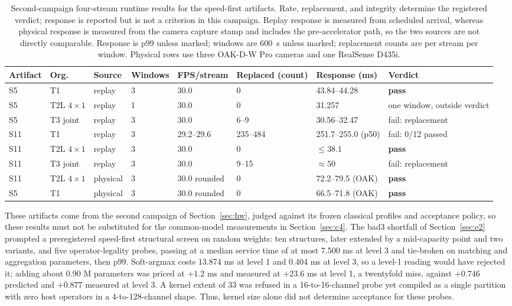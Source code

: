 \documentclass[sigconf,review,anonymous]{acmart}
\begin{document}
\begin{table}[t]
\centering
\footnotesize
\caption{Second-campaign four-stream runtime results for the speed-first artifacts. Rate, replacement, and integrity determine the registered verdict; response is reported but is not a criterion in this campaign. Replay response is measured from scheduled arrival, whereas physical response is measured from the camera capture stamp and includes the pre-accelerator path, so the two sources are not directly comparable. Response is p99 unless marked; windows are 600~s unless marked; replacement counts are per stream per window. Physical rows use three OAK-D-W Pro cameras and one RealSense D435i.}
\label{tab:sustained}
\begin{tabular}{llllllll}
\hline
Artifact & Org. & Source & Windows & FPS/stream & Replaced (count) & Response (ms) & Verdict\\
\hline
S5 & T1 & replay & 3 & 30.0 & 0 & 43.84--44.28 & \textbf{pass}\\
S5 & T2L $4\times1$ & replay & 1 & 30.0 & 0 & 31.257 & one window, outside verdict\\
S5 & T3 joint & replay & 3 & 30.0 & 6--9 & 30.56--32.47 & fail: replacement\\
S11 & T1 & replay & 3 & 29.2--29.6 & 235--484 & 251.7--255.0 (p50) & fail: 0/12 passed\\
S11 & T2L $4\times1$ & replay & 3 & 30.0 & 0 & $\le 38.1$ & \textbf{pass}\\
S11 & T3 joint & replay & 3 & 30.0 & 9--15 & $\approx 50$ & fail: replacement\\
\hline
S11 & T2L $4\times1$ & physical & 3 & 30.0 rounded & 0 & 72.2--79.5 (OAK) & \textbf{pass}\\
S5 & T1 & physical & 3 & 30.0 rounded & 0 & 66.5--71.8 (OAK) & \textbf{pass}\\
\hline
\end{tabular}
\end{table}

These artifacts come from the second campaign of Section~\ref{sec:hw}, judged against its frozen classical profiles and acceptance policy, so these results must not be substituted for the common-model measurements in Section~\ref{sec:c4}. The bad3 shortfall of Section~\ref{sec:e2} prompted a preregistered speed-first structural screen on random weights: ten structures, later extended by a mid-capacity point and two variants, and five operator-legality probes, passing at a median service time of at most 7.500 ms at level 3 and tie-broken on matching and aggregation parameters, then p99. Soft-argmax costs 13.874 ms at level 1 and 0.404 ms at level 3, so a level-1 reading would have rejected it; adding about 0.90 M parameters was priced at $+1.2$ ms and measured at $+23.6$ ms at level 1, a twentyfold miss, against $+0.746$ predicted and $+0.877$ measured at level 3. A kernel extent of 33 was refused in a 16-to-16-channel probe yet compiled as a single partition with zero host operators in a 4-to-128-channel shape. Thus, kernel size alone did not determine acceptance for these probes.
\end{document}
